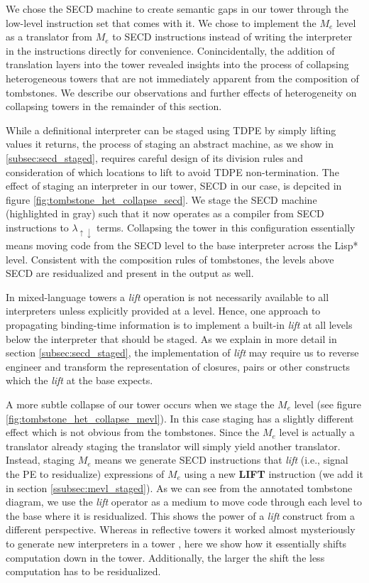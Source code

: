 \documentclass[a4paper,12pt,twoside,openright]{report}
\theoremstyle{definition}
\newcommand{\mslang}{$\lambda_{\uparrow\downarrow}$}
\newcommand{\mevl}{$M_{e}$}
\begin{document}
We chose the SECD machine to create semantic gaps in our tower through the low-level instruction set that comes with it. We chose to implement the \mevl{} level as a translator from \mevl{} to SECD instructions instead of writing the interpreter in the instructions directly for convenience. Conincidentally, the addition of translation layers into the tower revealed insights into the process of collapsing heterogeneous towers that are not immediately apparent from the composition of tombstones. We describe our observations and further effects of heterogeneity on collapsing towers in the remainder of this section.

While a definitional interpreter can be staged using TDPE by simply lifting values it returns, the process of staging an abstract machine, as we show in \ref{subsec:secd_staged}, requires careful design of its division rules and consideration of which locations to lift to avoid TDPE non-termination. The effect of staging an interpreter in our tower, SECD in our case, is depcited in figure \ref{fig:tombstone_het_collapse_secd}. We stage the SECD machine (highlighted in gray) such that it now operates as a compiler from SECD instructions to \mslang{} terms. Collapsing the tower in this configuration essentially means moving code from the SECD level to the base interpreter across the Lisp* level. Consistent with the composition rules of tombstones, the levels above SECD are residualized and present in the output as well.

In mixed-language towers a \textit{lift} operation is not necessarily available to all interpreters unless explicitly provided at a level. Hence, one approach to propagating binding-time information is to implement a built-in \textit{lift} at all levels below the interpreter that should be staged. As we explain in more detail in section \ref{subsec:secd_staged}, the implementation of \textit{lift} may require us to reverse engineer and transform the representation of closures, pairs or other constructs which the \textit{lift} at the base expects.

A more subtle collapse of our tower occurs when we stage the \mevl{} level (see figure \ref{fig:tombstone_het_collapse_mevl}). In this case staging has a slightly different effect which is not obvious from the tombstones. Since the \mevl{} level is actually a translator already staging the translator will simply yield another translator. Instead, staging \mevl{} means we generate SECD instructions that \textit{lift} (i.e., signal the PE to residualize) expressions of \mevl{} using a new \textbf{LIFT} instruction (we add it in section \ref{ssubsec:mevl_staged}). As we can see from the annotated tombstone diagram, we use the \textit{lift} operator as a medium to move code through each level to the base where it is residualized. This shows the power of a \textit{lift} construct from a different perspective. Whereas in reflective towers it worked almost mysteriously to generate new interpreters in a tower \cite{danvy1988intensions}, here we show how it essentially shifts computation down in the tower. Additionally, the larger the shift the less computation has to be residualized.
\end{document}
